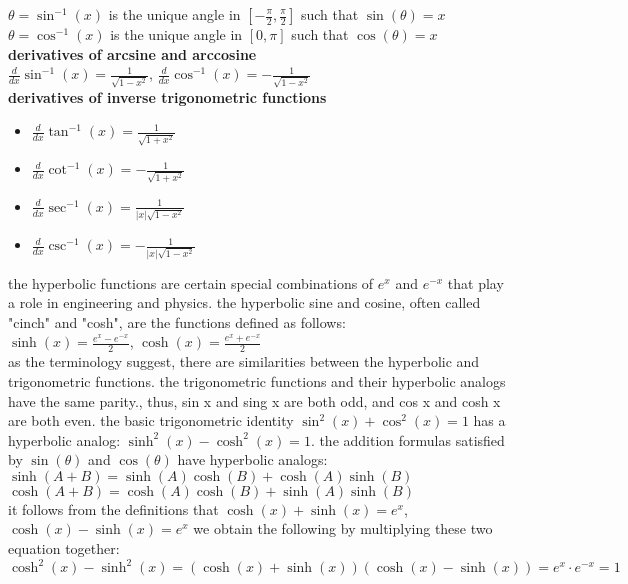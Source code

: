 \documentclass{article}
\begin{document}
$\theta = \sin^{-1}(x)$ is the unique angle in $[-\frac{\pi}{2}, \frac{\pi}{2}]$ such that $\sin(\theta) = x$\\
$\theta = \cos^{-1}(x)$ is the unique angle in $[0, \pi]$ such that $\cos(\theta) = x$\\

\textbf{derivatives of arcsine and arccosine}\\
$\frac{d}{dx}\sin^{-1}(x) = \frac{1}{\sqrt{1 - x^2}}$, $\frac{d}{dx}\cos^{-1}(x) = -\frac{1}{\sqrt{1 - x^2}}$\\  

\textbf{derivatives of inverse trigonometric functions}\\
	\begin{itemize}
		\item $\frac{d}{dx}\tan^{-1}(x) = \frac{1}{\sqrt{1 + x^2}}$ 
		\item $\frac{d}{dx}\cot^{-1}(x) = -\frac{1}{\sqrt{1 + x^2}}$ 
		\item $\frac{d}{dx}\sec^{-1}(x) = \frac{1}{\lvert x\rvert\sqrt{1 - x^2}}$ 
		\item $\frac{d}{dx}\csc^{-1}(x) = -\frac{1}{\lvert x\rvert\sqrt{1 - x^2}}$ 
	\end{itemize}

the hyperbolic functions are certain special combinations of $e^x$ and $e^{-x}$ that play a role in engineering and physics. the hyperbolic sine and cosine, often called "cinch" and "cosh", are the functions defined as follows:\\
$\sinh(x) = \frac{e^x - e^{-x}}{2}$, $\cosh(x) = \frac{e^x + e^{-x}}{2}$\\ as the terminology suggest, there are similarities between the hyperbolic and trigonometric functions. the trigonometric functions and their hyperbolic analogs have the same parity., thus, sin x and sing x are both odd, and cos x and cosh x are both even. the basic trigonometric identity $\sin^2(x) + \cos^2(x) = 1$ has a hyperbolic analog: $\sinh^2(x) - \cosh^2(x) = 1$. the addition formulas satisfied by $\sin(\theta)$ and $\cos(\theta)$ have hyperbolic analogs:\\
$\sinh(A + B) = \sinh(A)\cosh(B) + \cosh(A)\sinh(B)$\\
$\cosh(A + B) = \cosh(A)\cosh(B) + \sinh(A)\sinh(B)$\\		

it follows from the definitions that $\cosh(x) + \sinh(x) = e^x$, $\cosh(x) - \sinh(x) = e^x$ we obtain the following by multiplying these two equation together:\\ $\cosh^2(x) - \sinh^2(x) = (\cosh(x) + \sinh(x))(\cosh(x) - \sinh(x)) = e^x \cdot e^{-x} = 1$\\
\end{document}
